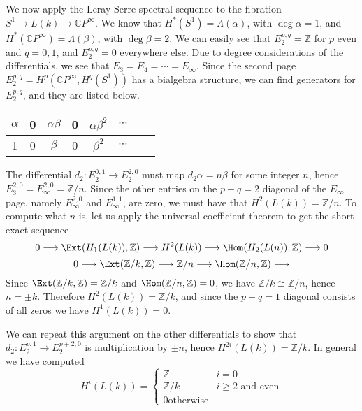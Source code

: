 We now apply the Leray-Serre spectral sequence to the fibration $S^1 \rightarrow L(k) \rightarrow \mathbb CP^\infty$. We know that $H^*(S^1) = \Lambda(\alpha)$, with $\deg \alpha = 1$, and $H^*(\mathbb CP^\infty) = \Lambda(\beta)$, with $\deg \beta = 2$. We can easily see that $E_2^{p,q} = \mathbb Z$ for $p$ even and $q=0,1$, and $E_2^{p,q} = 0$ everywhere else. Due to degree considerations of the differentials, we see that $E_3 = E_4 = \cdots = E_\infty$. Since the second page $E_2^{p,q}=H^p(\mathbb CP^\infty,H^q(S^1))$ has a bialgebra structure, we can find generators for $E_2^{p,q}$, and they are listed below.
\begin{table}[h]
\centering
\begin{tabular}{|c|c|c|c|c|c|c|c|}
	\hline
	$\alpha$ & 0 & $\alpha \beta$ & 0 & $\alpha\beta^2$ & $\cdots$ \\
	\hline
	1 & 0 & $\beta$ & 0 & $\beta^2$ & $\cdots$ \\
	\hline
\end{tabular}
\end{table}
The differential $d_2 : E_2^{0,1} \rightarrow E_2^{2,0}$ must map $d_2 \alpha = n\beta$ for some integer $n$, hence $E_3^{2,0} = E_\infty^{2,0} = \mathbb Z/n$. Since the other entries on the $p+q=2$ diagonal of the $E_\infty$ page, namely $E_\infty^{2,0}$ and $E_\infty^{1,1}$, are zero, we must have that $H^2(L(k)) = \mathbb Z/n$. To compute what $n$ is, let us apply the universal coefficient theorem to get the short exact sequence
\[ 0 \longrightarrow \Ext(H_1(L(k)),\mathbb Z) \longrightarrow H^2(L(k)) \longrightarrow \Hom(H_2(L(n)),\mathbb Z) \longrightarrow 0 \]
\[ 0 \longrightarrow \Ext(\mathbb Z/k,\mathbb Z) \longrightarrow \mathbb Z/n \longrightarrow \Hom(\mathbb Z/n, \mathbb Z) \longrightarrow \]
Since $\Ext(\mathbb Z/k,\mathbb Z) = \mathbb Z/k$ and $\Hom(\mathbb Z/n,\mathbb Z) = 0$, we have $\mathbb Z/k \cong \mathbb Z/n$, hence $n = \pm k$. Therefore $H^2(L(k)) = \mathbb Z/k$, and since the $p+q=1$ diagonal consists of all zeros we have $H^1(L(k)) = 0$.

We can repeat this argument on the other differentials to show that $d_2 :E_2^{p,1} \rightarrow E_2^{p+2,0}$ is multiplication by $\pm n$, hence $H^{2i}(L(k)) = \mathbb Z/k$. In general we have computed
\[ H^i(L(k)) = \begin{cases} \mathbb Z & i = 0 \\ \mathbb Z/k & i \geq 2 \text{ and even} \\ 0 \text{otherwise} \end{cases} \]



